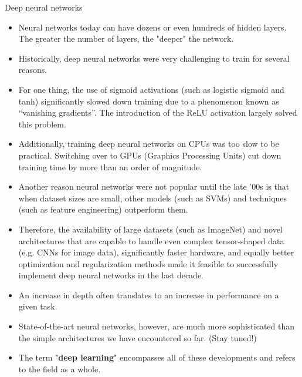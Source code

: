 \begin{vbframe}{Deep neural networks}

  \begin{itemize}
    \item Neural networks today can have dozens or even hundreds of hidden layers. The greater the number of layers, the "deeper" the network. 
    \item Historically, deep neural networks were very challenging to train for several reasons.
    \item For one thing, the use of sigmoid activations (such as logistic sigmoid and tanh) significantly slowed down training due to a phenomenon known as \enquote{vanishing gradients}. The introduction of the ReLU activation largely solved this problem.
    \item Additionally, training deep neural networks on CPUs was too slow to be practical. Switching over to GPUs (Graphics Processing Units) cut down training time by more than an order of magnitude.
    \item Another reason neural networks were not popular until the late '00s is that when dataset sizes are small, other models (such as SVMs) and techniques (such as feature engineering) outperform them. 
    \item Therefore, the availability of large datasets (such as ImageNet) and novel architectures that are capable to handle even complex tensor-shaped data (e.g. CNNs for image data), significantly faster hardware, and equally better optimization and regularization methods made it feasible to successfully implement deep neural networks in the last decade.
    \item An increase in depth often translates to an increase in performance on a given task. 
    \item State-of-the-art neural networks, however, are much more sophisticated than the simple architectures we have encountered so far. (Stay tuned!)
    \item The term "\textbf{deep learning}" encompasses all of these developments and refers to the field as a whole.
  \end{itemize}
\end{vbframe}


% 



